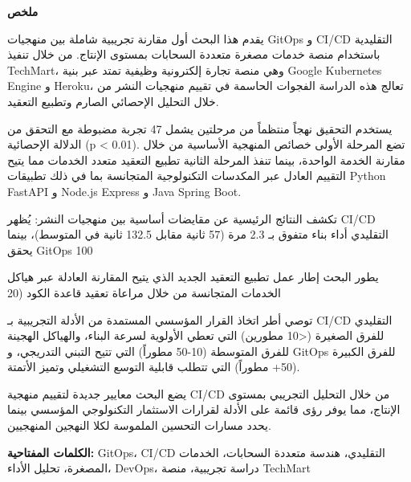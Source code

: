 \thispagestyle{empty}

\begin{center}
{\Large \textbf{\textarabic{ملخص}}}
\end{center}

\vspace{1cm}

\begin{otherlanguage}{arabic}
\begin{RTL}

يقدم هذا البحث أول مقارنة تجريبية شاملة بين منهجيات GitOps و CI/CD التقليدية باستخدام منصة خدمات مصغرة متعددة السحابات بمستوى الإنتاج. من خلال تنفيذ TechMart، وهي منصة تجارة إلكترونية وظيفية تمتد عبر بنية Google Kubernetes Engine و Heroku، تعالج هذه الدراسة الفجوات الحاسمة في تقييم منهجيات النشر من خلال التحليل الإحصائي الصارم وتطبيع التعقيد.

يستخدم التحقيق نهجاً منتظماً من مرحلتين يشمل 47 تجربة مضبوطة مع التحقق من الدلالة الإحصائية (p < 0.01). تضع المرحلة الأولى خصائص المنهجية الأساسية من خلال مقارنة الخدمة الواحدة، بينما تنفذ المرحلة الثانية تطبيع التعقيد متعدد الخدمات مما يتيح التقييم العادل عبر المكدسات التكنولوجية المتجانسة بما في ذلك تطبيقات Python FastAPI و Node.js Express و Java Spring Boot.

تكشف النتائج الرئيسية عن مقايضات أساسية بين منهجيات النشر: يُظهر CI/CD التقليدي أداء بناء متفوق بـ 2.3 مرة (57 ثانية مقابل 132.5 ثانية في المتوسط)، بينما يحقق GitOps 100%

يطور البحث إطار عمل تطبيع التعقيد الجديد الذي يتيح المقارنة العادلة عبر هياكل الخدمات المتجانسة من خلال مراعاة تعقيد قاعدة الكود (20%

توصي أطر اتخاذ القرار المؤسسي المستمدة من الأدلة التجريبية بـ CI/CD التقليدي للفرق الصغيرة (<10 مطورين) التي تعطي الأولوية لسرعة البناء، والهياكل الهجينة للفرق المتوسطة (10-50 مطوراً) التي تتيح التبني التدريجي، و GitOps للفرق الكبيرة (50+ مطوراً) التي تتطلب قابلية التوسع التشغيلي وتميز الأتمتة.

يضع البحث معايير جديدة لتقييم منهجية CI/CD من خلال التحليل التجريبي بمستوى الإنتاج، مما يوفر رؤى قائمة على الأدلة لقرارات الاستثمار التكنولوجي المؤسسي بينما يحدد مسارات التحسين الملموسة لكلا النهجين المنهجيين.

\textbf{الكلمات المفتاحية:} GitOps، CI/CD التقليدي، هندسة متعددة السحابات، الخدمات المصغرة، تحليل الأداء، DevOps، دراسة تجريبية، منصة TechMart

\end{RTL}
\end{otherlanguage}

\newpage